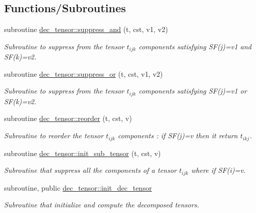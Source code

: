 \subsection*{Functions/\+Subroutines}
\begin{DoxyCompactItemize}
\item 
subroutine \hyperlink{namespacedec__tensor_ab08c915c2a920d5cc6c0e47b21f696dc}{dec\+\_\+tensor\+::suppress\+\_\+and} (t, cst, v1, v2)
\begin{DoxyCompactList}\small\item\em Subroutine to suppress from the tensor $t_{ijk}$ components satisfying S\+F(j)=v1 and S\+F(k)=v2. \end{DoxyCompactList}\item 
subroutine \hyperlink{namespacedec__tensor_a03a1804765394ccacbb505b3604904a7}{dec\+\_\+tensor\+::suppress\+\_\+or} (t, cst, v1, v2)
\begin{DoxyCompactList}\small\item\em Subroutine to suppress from the tensor $t_{ijk}$ components satisfying S\+F(j)=v1 or S\+F(k)=v2. \end{DoxyCompactList}\item 
subroutine \hyperlink{namespacedec__tensor_ae780336fa841c576c2e4933365a59be7}{dec\+\_\+tensor\+::reorder} (t, cst, v)
\begin{DoxyCompactList}\small\item\em Subroutine to reorder the tensor $t_{ijk}$ components \+: if S\+F(j)=v then it return $t_{ikj}$. \end{DoxyCompactList}\item 
subroutine \hyperlink{namespacedec__tensor_a2379bf5216a994cb1811e57f5957d477}{dec\+\_\+tensor\+::init\+\_\+sub\+\_\+tensor} (t, cst, v)
\begin{DoxyCompactList}\small\item\em Subroutine that suppress all the components of a tensor $t_{ijk}$ where if S\+F(i)=v. \end{DoxyCompactList}\item 
subroutine, public \hyperlink{namespacedec__tensor_ad5519f1ab9898c840a182152efe30240}{dec\+\_\+tensor\+::init\+\_\+dec\+\_\+tensor}
\begin{DoxyCompactList}\small\item\em Subroutine that initialize and compute the decomposed tensors. \end{DoxyCompactList}\end{DoxyCompactItemize}
